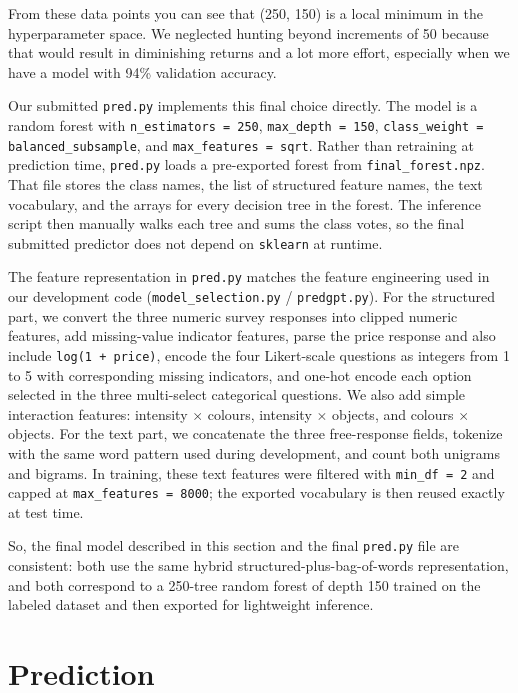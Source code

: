 \documentclass[12pt]{article}
\begin{document}
From these data points you can see that (250, 150) is a local minimum in the hyperparameter space. We neglected hunting beyond increments of 50 because that would result in diminishing returns and a lot more effort, especially when we have a model with 94\% validation accuracy.

Our submitted \texttt{pred.py} implements this final choice directly. The model is a random forest with \texttt{n\_estimators = 250}, \texttt{max\_depth = 150}, \texttt{class\_weight = balanced\_subsample}, and \texttt{max\_features = sqrt}. Rather than retraining at prediction time, \texttt{pred.py} loads a pre-exported forest from \texttt{final\_forest.npz}. That file stores the class names, the list of structured feature names, the text vocabulary, and the arrays for every decision tree in the forest. The inference script then manually walks each tree and sums the class votes, so the final submitted predictor does not depend on \texttt{sklearn} at runtime.

The feature representation in \texttt{pred.py} matches the feature engineering used in our development code (\texttt{model\_selection.py} / \texttt{predgpt.py}). For the structured part, we convert the three numeric survey responses into clipped numeric features, add missing-value indicator features, parse the price response and also include \texttt{log(1 + price)}, encode the four Likert-scale questions as integers from 1 to 5 with corresponding missing indicators, and one-hot encode each option selected in the three multi-select categorical questions. We also add simple interaction features: intensity $\times$ colours, intensity $\times$ objects, and colours $\times$ objects. For the text part, we concatenate the three free-response fields, tokenize with the same word pattern used during development, and count both unigrams and bigrams. In training, these text features were filtered with \texttt{min\_df = 2} and capped at \texttt{max\_features = 8000}; the exported vocabulary is then reused exactly at test time.

So, the final model described in this section and the final \texttt{pred.py} file are consistent: both use the same hybrid structured-plus-bag-of-words representation, and both correspond to a 250-tree random forest of depth 150 trained on the labeled dataset and then exported for lightweight inference.

\section{Prediction}
\end{document}
